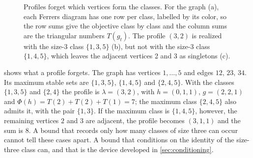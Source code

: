 \documentclass[11pt]{article}
\theoremstyle{definition}
\begin{document}
\begin{figure}[t]
\centering
{}
\caption{Profiles forget which vertices form the classes. For the graph (a),
each Ferrers diagram has one row per class, labelled by its color, so the
row sums give the objective class by class and the column sums are the
triangular numbers $T(g_t)$. The profile $(3,2)$ is realized with the
size-3 class $\{1,3,5\}$ (b), but not with the size-3 class $\{1,4,5\}$,
which leaves the adjacent vertices 2 and 3 as singletons (c).}
\label{fig:five-vertex}
\end{figure}

 shows what a profile forgets. The graph has vertices
$1,\ldots,5$ and edges $12$, $23$, $34$. Its maximum stable sets are
$\{1,3,5\}$, $\{1,4,5\}$ and $\{2,4,5\}$. With the classes $\{1,3,5\}$ and
$\{2,4\}$ the profile is $\lambda=(3,2)$, with $h=(0,1,1)$, $g=(2,2,1)$ and
$\Phi(h)=T(2)+T(2)+T(1)=7$; the maximum class $\{2,4,5\}$ also admits it,
with the pair $\{1,3\}$. If the maximum class is $\{1,4,5\}$, however, the
remaining vertices $2$ and $3$ are adjacent, the profile becomes $(3,1,1)$
and the sum is $8$. A bound that records only how many classes of size three
can occur cannot tell these cases apart. A bound that conditions on the
identity of the size-three class can, and that is the device developed in
\cref{sec:conditioning}.
\end{document}
